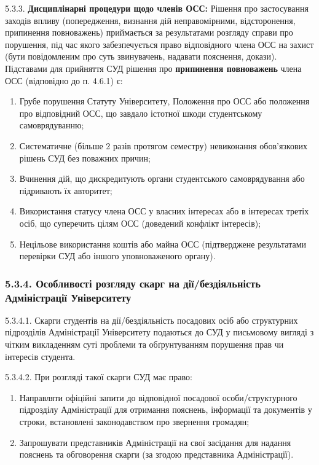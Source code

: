     5.3.3. \textbf{Дисциплінарні процедури щодо членів ОСС:} Рішення про застосування заходів впливу (попередження, визнання дій неправомірними, відсторонення, припинення повноважень) приймається за результатами розгляду справи про порушення, під час якого забезпечується право відповідного члена ОСС на захист (бути повідомленим про суть звинувачень, надавати пояснення, докази). Підставами для прийняття СУД рішення про \textbf{припинення повноважень} члена ОСС (відповідно до п. 4.6.1) є:

        \begin{enumerate}[label=\roman*)]
            \item Грубе порушення Статуту Університету, Положення про ОСС або положення про відповідний ОСС, що завдало істотної шкоди студентському самоврядуванню;
            \item Систематичне (більше 2 разів протягом семестру) невиконання обов'язкових рішень СУД без поважних причин;
            \item Вчинення дій, що дискредитують органи студентського самоврядування або підривають їх авторитет;
            \item Використання статусу члена ОСС у власних інтересах або в інтересах третіх осіб, що суперечить цілям ОСС (доведений конфлікт інтересів);
            \item Нецільове використання коштів або майна ОСС (підтверджене результатами перевірки СУД або іншого уповноваженого органу).
        \end{enumerate}

    \subsubsection*{5.3.4. Особливості розгляду скарг на дії/бездіяльність Адміністрації Університету}
        5.3.4.1. Скарги студентів на дії/бездіяльність посадових осіб або структурних підрозділів Адміністрації Університету подаються до СУД у письмовому вигляді з чітким викладенням суті проблеми та обґрунтуванням порушення прав чи інтересів студента.

        5.3.4.2. При розгляді такої скарги СУД має право:

            \begin{enumerate}[label=\alph*)]
                \item Направляти офіційні запити до відповідної посадової особи/структурного підрозділу Адміністрації для отримання пояснень, інформації та документів у строки, встановлені законодавством про звернення громадян;
                \item Запрошувати представників Адміністрації на свої засідання для надання пояснень та обговорення скарги (за згодою представника Адміністрації).
            \end{enumerate}


